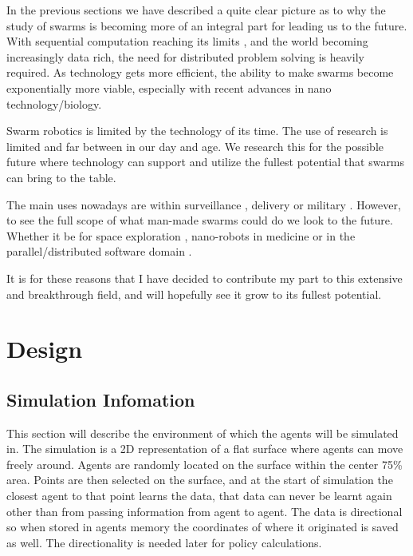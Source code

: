 \documentclass{UoYCSproject}
\begin{document}
In the previous sections we have described a quite clear picture as to why the study of swarms is becoming more of an integral part for leading us to the future. 
With sequential computation reaching its limits \cite{CPU speed}, and the world becoming increasingly data rich, the need for distributed problem solving is heavily required. 
As technology gets more efficient, the ability to make swarms become exponentially more viable, especially with recent advances in nano technology/biology.

Swarm robotics is limited by the technology of its time. 
The use of research is limited and far between in our day and age. 
We research this for the possible future where technology can support and utilize the fullest potential that swarms can bring to the table.

The main uses nowadays are within surveillance \cite{UAV, HiveMind}, delivery or military \cite{Swarm robotics reviewed}. 
However, to see the full scope of what man-made swarms could do we look to the future. 
Whether it be for space exploration \cite{Space exploration}, nano-robots in medicine or in the parallel/distributed software domain \cite{blockchainandSwarm}. 

It is for these reasons that I have decided to contribute my part to this extensive and breakthrough field, and will hopefully see it grow to its fullest potential.


\chapter{Design}
\label{cha:Design}


\section{Simulation Infomation}
\label{sec:Sim Info}

This section will describe the environment of which the agents will be simulated in. 
The simulation is a 2D representation of a flat surface where agents can move freely around. 
Agents are randomly located on the surface within the center 75\% area. 
Points are then selected on the surface, and at the start of simulation the closest agent to that point learns the data, that data can never be learnt again other than from passing information from agent to agent. 
The data is directional so when stored in agents memory the coordinates of where it originated is saved as well. 
The directionality is needed later for policy calculations.
\end{document}
